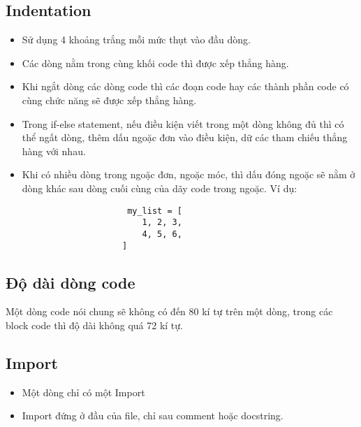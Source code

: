 \documentclass[a4paper]{report}
\begin{document}
	\subsection{Indentation}
	\begin{itemize}
		\item Sử dụng 4 khoảng trắng mỗi mức thụt vào đầu dòng.
		\item Các dòng nằm trong cùng khối code thì được xếp thẳng hàng.
		\item Khi ngắt dòng các dòng code thì các đoạn code hay các thành phần code
		có cùng chức năng sẽ được xếp thẳng hàng.
		\item Trong if-else statement, nếu điều kiện viết trong một dòng không đủ thì
		có thể ngất dòng, thêm dấu ngoặc đơn vào điều kiện, dữ các tham chiếu thẳng hàng 
		với nhau.
		\item Khi có nhiều dòng trong ngoặc đơn, ngoặc móc, thì dấu đóng ngoặc sẽ nằm ở
		dòng khác sau dòng cuối cùng của dãy code trong ngoặc. Ví dụ:
		\begin{verbatim}
			         my_list = [
    			        1, 2, 3,
    			        4, 5, 6,
    			    ]
    		\end{verbatim}
	\end{itemize}
	\subsection{Độ dài dòng code}
	\hspace*{8mm} Một dòng code nói chung sẽ không có đến 80 kí tự trên một dòng, trong các 
	block code thì độ dài không quá 72 kí tự.
	\subsection{Import}
	\begin{itemize}
		\item Một dòng chỉ có một Import
		\item Import đứng ở đầu của file, chỉ sau comment hoặc docstring.
	\end{itemize}		
\end{document}
